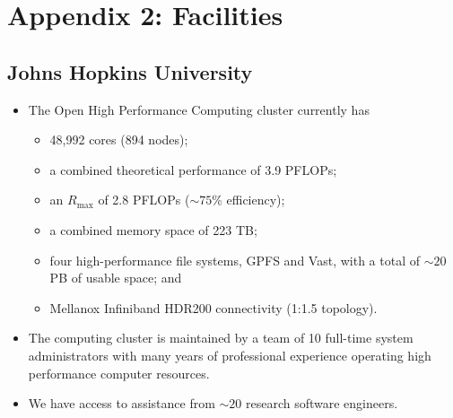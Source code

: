 \documentclass{NSF}
\begin{document}
\sloppy

\clearpage
\setcounter{page}{1}

\section*{Appendix 2: Facilities}

\subsection{Johns Hopkins University}

\begin{itemize}

\item The Open High Performance Computing cluster currently has

\begin{itemize}
\item 48,992 cores (894 nodes);
\item a combined theoretical performance of 3.9 PFLOPs;  
\item an $R_\mathrm{max}$ of 2.8 PFLOPs ($\sim \!75$\% efficiency); 
\item a combined memory space of 223 TB;
\item four high-performance file systems, GPFS and Vast, with a total of $\sim \! 20$ PB of usable space; and
\item Mellanox Infiniband HDR200 connectivity (1:1.5 topology).

\end{itemize}

\item The computing cluster is maintained by a team of 10 full-time system administrators with many years of professional experience operating high performance computer resources.

\item We have access to assistance from $\sim \! 20$ research software engineers.

\end{itemize}


\end{document}
